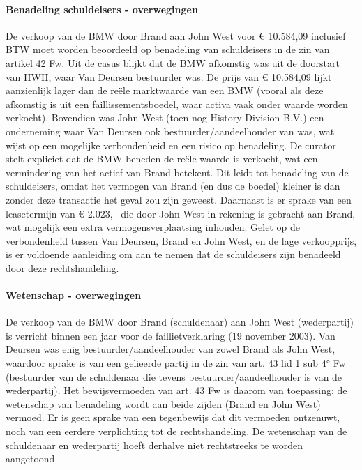 \documentclass[
  dutch,
  a4paper,
]{article}
\begin{document}
\paragraph{Benadeling schuldeisers - overwegingen}\label{benadeling-schuldeisers---overwegingen-54}

De verkoop van de BMW door Brand aan John West voor € 10.584,09 inclusief BTW moet worden beoordeeld op benadeling van schuldeisers in de zin van artikel 42 Fw. Uit de casus blijkt dat de BMW afkomstig was uit de doorstart van HWH, waar Van Deursen bestuurder was. De prijs van € 10.584,09 lijkt aanzienlijk lager dan de reële marktwaarde van een BMW (vooral als deze afkomstig is uit een faillissementsboedel, waar activa vaak onder waarde worden verkocht). Bovendien was John West (toen nog History Division B.V.) een onderneming waar Van Deursen ook bestuurder/aandeelhouder van was, wat wijst op een mogelijke verbondenheid en een risico op benadeling. De curator stelt expliciet dat de BMW beneden de reële waarde is verkocht, wat een vermindering van het actief van Brand betekent. Dit leidt tot benadeling van de schuldeisers, omdat het vermogen van Brand (en dus de boedel) kleiner is dan zonder deze transactie het geval zou zijn geweest. Daarnaast is er sprake van een leasetermijn van € 2.023,-- die door John West in rekening is gebracht aan Brand, wat mogelijk een extra vermogensverplaatsing inhouden. Gelet op de verbondenheid tussen Van Deursen, Brand en John West, en de lage verkoopprijs, is er voldoende aanleiding om aan te nemen dat de schuldeisers zijn benadeeld door deze rechtshandeling.

\paragraph{Wetenschap - overwegingen}\label{wetenschap---overwegingen-54}

De verkoop van de BMW door Brand (schuldenaar) aan John West (wederpartij) is verricht binnen een jaar voor de faillietverklaring (19 november 2003). Van Deursen was enig bestuurder/aandeelhouder van zowel Brand als John West, waardoor sprake is van een gelieerde partij in de zin van art. 43 lid 1 sub 4° Fw (bestuurder van de schuldenaar die tevens bestuurder/aandeelhouder is van de wederpartij). Het bewijsvermoeden van art. 43 Fw is daarom van toepassing: de wetenschap van benadeling wordt aan beide zijden (Brand en John West) vermoed. Er is geen sprake van een tegenbewijs dat dit vermoeden ontzenuwt, noch van een eerdere verplichting tot de rechtshandeling. De wetenschap van de schuldenaar en wederpartij hoeft derhalve niet rechtstreeks te worden aangetoond.
\end{document}
